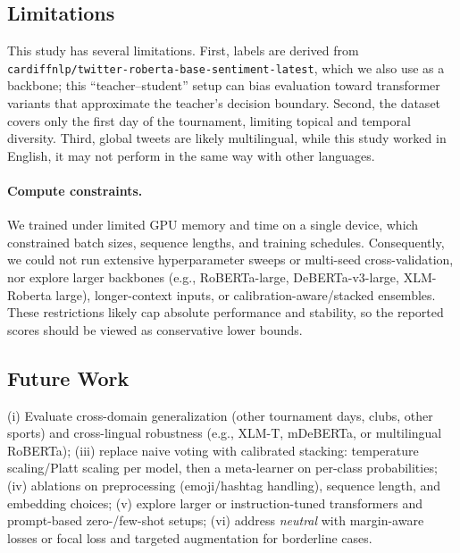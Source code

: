 \documentclass[10pt]{article}
\begin{document}
\subsection{Limitations}
This study has several limitations. First, labels are derived from \texttt{cardiffnlp/twitter-roberta-base-sentiment-latest}, which we also use as a backbone; this ``teacher--student'' setup can bias evaluation toward transformer variants that approximate the teacher's decision boundary. Second, the dataset covers only the first day of the tournament, limiting topical and temporal diversity. Third, global tweets are likely multilingual, while this study worked in English, it may not perform in the same way with other languages.

\paragraph{Compute constraints.}
We trained under limited GPU memory and time on a single device, which constrained batch sizes, sequence lengths, and training schedules. Consequently, we could not run extensive hyperparameter sweeps or multi-seed cross-validation, nor explore larger backbones (e.g., RoBERTa-large, DeBERTa-v3-large, XLM-Roberta large), longer-context inputs, or calibration-aware/stacked ensembles. These restrictions likely cap absolute performance and stability, so the reported scores should be viewed as conservative lower bounds.

\subsection{Future Work}
(i) Evaluate cross-domain generalization (other tournament days, clubs, other sports) and cross-lingual robustness (e.g., XLM-T, mDeBERTa, or multilingual RoBERTa); (iii) replace naive voting with calibrated stacking: temperature scaling/Platt scaling per model, then a meta-learner on per-class probabilities; (iv) ablations on preprocessing (emoji/hashtag handling), sequence length, and embedding choices; (v) explore larger or instruction-tuned transformers and prompt-based zero-/few-shot setups; (vi) address \emph{neutral} with margin-aware losses or focal loss and targeted augmentation for borderline cases.
\end{document}
